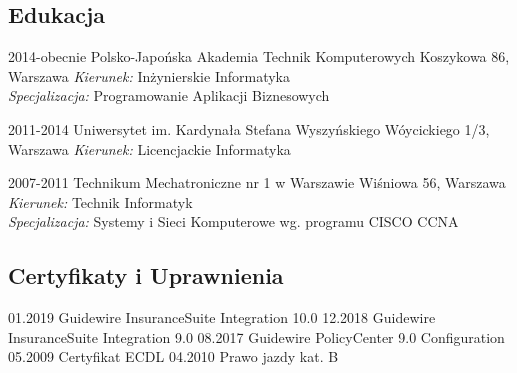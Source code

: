 \documentclass[]{friggeri-cv} %
\begin{document}
	\begin{absolutelynopagebreak}
		\section{Edukacja}
		\begin{entrylist}
			\entry
			{2014-obecnie}
			{Polsko-Japońska Akademia Technik Komputerowych}
			{Koszykowa 86, Warszawa}
			{\emph{Kierunek:} Inżynierskie Informatyka\\
			\emph{Specjalizacja:} Programowanie Aplikacji Biznesowych}
		\end{entrylist}
		\begin{entrylist}
			\entry
			{2011-2014}
			{Uniwersytet im. Kardynała Stefana Wyszyńskiego}
			{Wóycickiego 1/3, Warszawa}
			{\emph{Kierunek:} Licencjackie Informatyka}
		\end{entrylist}
		\begin{entrylist}
			\entry
			{2007-2011}
			{Technikum Mechatroniczne nr 1 w Warszawie}
			{Wiśniowa 56, Warszawa}
			{\emph{Kierunek:} Technik Informatyk\\
			\emph{Specjalizacja:} Systemy i Sieci Komputerowe wg. programu CISCO CCNA}
		\end{entrylist}
	\end{absolutelynopagebreak}
	
	\begin{absolutelynopagebreak}
		\section{Certyfikaty i Uprawnienia}
		\begin{entrylist}
			\cert
			{01.2019}
			{Guidewire InsuranceSuite Integration 10.0}
			\cert
			{12.2018}
			{Guidewire InsuranceSuite Integration 9.0}
			\cert
			{08.2017}
			{Guidewire PolicyCenter 9.0 Configuration}
			\cert
			{05.2009}
			{Certyfikat ECDL}
			\cert
			{04.2010}
			{Prawo jazdy kat. B}
		\end{entrylist}
	\end{absolutelynopagebreak}
	
\end{document}
